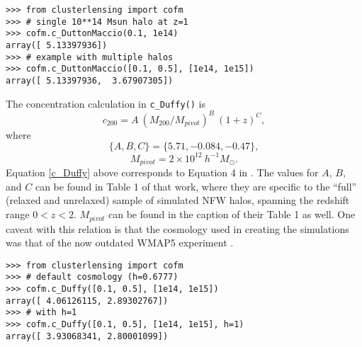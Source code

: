 \documentclass[twocolumn]{aastex6}
\newcommand{\code}{\lstinline[style=codeintext]}
\begin{document}
\begin{verbatim}
>>> from clusterlensing import cofm
>>> # single 10**14 Msun halo at z=1
>>> cofm.c_DuttonMaccio(0.1, 1e14)
array([ 5.13397936])
>>> # example with multiple halos
>>> cofm.c_DuttonMaccio([0.1, 0.5], [1e14, 1e15])
array([ 5.13397936,  3.67907305])
\end{verbatim}

The concentration calculation in \code{c_Duffy()} is
\begin{equation}\label{c_Duffy}
c_{200} = A\ (M_{200} / M_{pivot})^B \ (1 + z)^C,
\end{equation}
where
\begin{equation}
\{A, B, C\} = \{5.71, -0.084, -0.47\},
\end{equation}
\begin{equation}
M_{pivot} = 2 \times 10^{12}\ h^{-1} M_\odot.
\end{equation}
Equation \ref{c_Duffy} above corresponds to Equation 4 in \citet{Duffy08}. The values for $A$, $B$, and $C$ can be found in Table 1 of that work, where they are specific to the ``full'' (relaxed and unrelaxed) sample of simulated NFW halos, spanning the redshift range $0 < z < 2$. $M_{pivot}$ can be found in the caption of their Table 1 as well. One caveat with this relation is that the cosmology used in creating the \citet{Duffy08} simulations was that of the now outdated WMAP5 experiment \citep{WMAP5}.

\begin{verbatim}
>>> from clusterlensing import cofm
>>> # default cosmology (h=0.6777)
>>> cofm.c_Duffy([0.1, 0.5], [1e14, 1e15])
array([ 4.06126115, 2.89302767])
>>> # with h=1
>>> cofm.c_Duffy([0.1, 0.5], [1e14, 1e15], h=1)
array([ 3.93068341, 2.80001099])
\end{verbatim}
\end{document}
